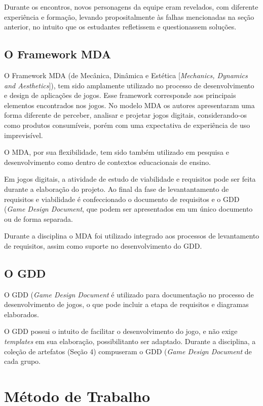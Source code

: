 \documentclass[12pt, onecolumn]{IEEEtran}
\begin{document}
Durante os encontros, novos personagens da equipe eram revelados, com diferente experiência e formação, levando propositalmente às falhas mencionadas na seção anterior, no intuito que os estudantes refletissem e questionassem soluções.

\subsection{O Framework MDA}

O  Framework  MDA (de Mecânica, Dinâmica e Estética [\textit{Mechanics, Dynamics and Aesthetics}]), tem  sido amplamente  utilizado no processo de desenvolvimento e design de aplicações de jogos. Esse framework corresponde aos principais elementos  encontrados  nos  jogos. No modelo MDA os autores apresentaram uma forma diferente de perceber, analisar e projetar jogos digitais, considerando-os como produtos consumíveis, porém com uma expectativa de experiência de uso imprevisível\cite{b12}.

O MDA, por sua flexibilidade, tem sido também utilizado em pesquisa e desenvolvimento\cite{b13} como dentro de contextos educacionais de ensino\cite{b14}. 

 Em jogos digitais, a atividade de estudo de viabilidade e requisitos pode ser feita durante a elaboração do projeto. Ao final da fase de levantantamento de requisitos e viabilidade é confeccionado o documento de requisitos e o GDD (\textit{Game Design Document}\cite{b15}, que podem ser apresentados em um único documento ou de forma separada. 
 
 Durante a disciplina o MDA foi utilizado integrado aos processos de levantamento de requisitos, assim como suporte no desenvolvimento do GDD.
 
 \subsection{O GDD}
 
 O GDD (\textit{Game Design Document} é utilizado para documentação no processo de desenvolvimento de jogos, o que pode incluir a etapa de requisitos e diagramas elaborados.
 
 O GDD possui o intuito de facilitar o desenvolvimento do jogo, e não exige \textit{templates}\cite{b16} em sua elaboração, possibilitanto ser adaptado. 
 Durante a disciplina, a coleção de artefatos (Seção 4) compuseram o GDD (\textit{Game Design Document} de cada grupo.
 
\section{Método de Trabalho}
\end{document}
